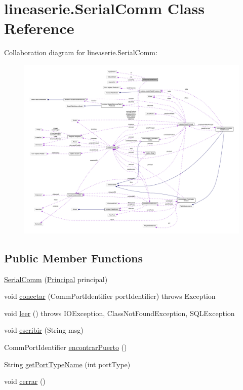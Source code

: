 \hypertarget{classlineaserie_1_1_serial_comm}{}\section{lineaserie.\+Serial\+Comm Class Reference}
\label{classlineaserie_1_1_serial_comm}


Collaboration diagram for lineaserie.\+Serial\+Comm\+:\nopagebreak
\begin{figure}[H]
\begin{center}
\leavevmode
\includegraphics[width=350pt]{classlineaserie_1_1_serial_comm__coll__graph}
\end{center}
\end{figure}
\subsection*{Public Member Functions}
\begin{DoxyCompactItemize}
\item 
\mbox{\hyperlink{classlineaserie_1_1_serial_comm_af7acba71f36fc78ac2555f52cb6e6c91}{Serial\+Comm}} (\mbox{\hyperlink{classvistas_1_1_principal}{Principal}} principal)
\item 
void \mbox{\hyperlink{classlineaserie_1_1_serial_comm_a877035aa389c7d3ceef75f1927afd4d5}{conectar}} (Comm\+Port\+Identifier port\+Identifier)  throws Exception     
\item 
void \mbox{\hyperlink{classlineaserie_1_1_serial_comm_a9e5dc899a435cb7bbd14c50af1e69a9e}{leer}} ()  throws I\+O\+Exception, Class\+Not\+Found\+Exception, S\+Q\+L\+Exception     
\item 
void \mbox{\hyperlink{classlineaserie_1_1_serial_comm_aafba8fce6137b4b5a5e7795f07fef02c}{escribir}} (String msg)
\item 
Comm\+Port\+Identifier \mbox{\hyperlink{classlineaserie_1_1_serial_comm_ac940f6b749e1137f5f1233b320e0e46f}{encontrar\+Puerto}} ()
\item 
String \mbox{\hyperlink{classlineaserie_1_1_serial_comm_ae0ae445e9464e90c1f4ebe3e943d0788}{get\+Port\+Type\+Name}} (int port\+Type)
\item 
void \mbox{\hyperlink{classlineaserie_1_1_serial_comm_a4bc07b152edbc3d04b42677ee93e3504}{cerrar}} ()
\end{DoxyCompactItemize}


